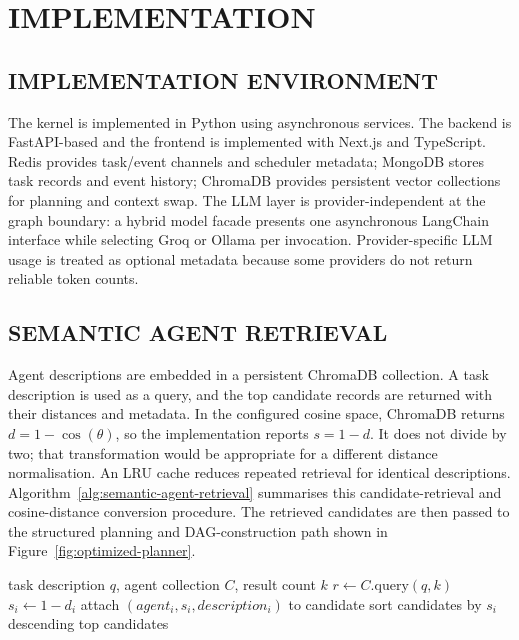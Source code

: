 \chapter{\uppercase{Implementation}}
\label{chap4}

\section{\uppercase{Implementation Environment}}
The kernel is implemented in Python using asynchronous services. The backend is FastAPI-based and the frontend is implemented with Next.js and TypeScript. Redis provides task/event channels and scheduler metadata; MongoDB stores task records and event history; ChromaDB provides persistent vector collections for planning and context swap. The LLM layer is provider-independent at the graph boundary: a hybrid model facade presents one asynchronous LangChain interface while selecting Groq or Ollama per invocation. Provider-specific LLM usage is treated as optional metadata because some providers do not return reliable token counts.

\section{\uppercase{Semantic Agent Retrieval}}
Agent descriptions are embedded in a persistent ChromaDB collection. A task description is used as a query, and the top candidate records are returned with their distances and metadata. In the configured cosine space, ChromaDB returns $d=1-\cos(\theta)$, so the implementation reports $s=1-d$. It does not divide by two; that transformation would be appropriate for a different distance normalisation. An LRU cache reduces repeated retrieval for identical descriptions. Algorithm~\ref{alg:semantic-agent-retrieval} summarises this candidate-retrieval and cosine-distance conversion procedure. The retrieved candidates are then passed to the structured planning and DAG-construction path shown in Figure~\ref{fig:optimized-planner}.

\begin{algorithm}[H]
\caption{Semantic Agent Retrieval}
\label{alg:semantic-agent-retrieval}
\begin{algorithmic}[1]
\Require task description $q$, agent collection $C$, result count $k$
\State $r \gets C.\mathrm{query}(q,k)$
\State $s_i \gets 1-d_i$
\State attach $(agent_i,s_i,description_i)$ to candidate
\EndFor
\State sort candidates by $s_i$ descending
\State \Return top candidates
\end{algorithmic}
\end{algorithm}
